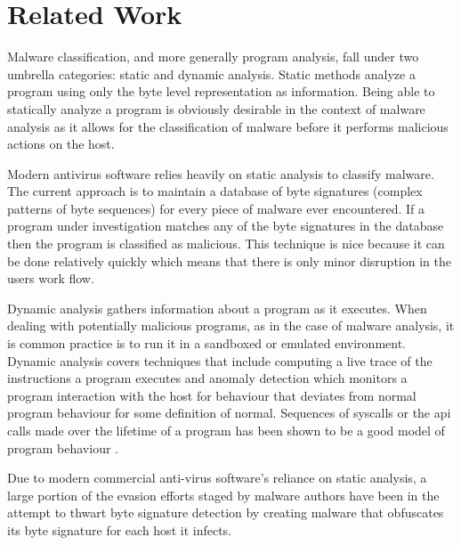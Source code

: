 \chapter{Related Work}

    Malware classification, and more generally program analysis, fall under two
    umbrella categories: static and dynamic analysis. Static methods analyze a
    program using only the byte level representation as information. Being able
    to statically analyze a program is obviously desirable in the context of
    malware analysis as it allows for the classification of malware before it
    performs malicious actions on the host.
    
    Modern antivirus software relies heavily on static analysis to classify
    malware. The current approach is to maintain a database of byte signatures
    (complex patterns of byte sequences) for every piece of malware ever
    encountered. If a program under investigation matches any of the byte
    signatures in the database then the program is classified as malicious.
    This technique is nice because it can be done relatively quickly which means
    that there is only minor disruption in the users work flow.

    Dynamic analysis gathers information about a program as it executes. When
    dealing with potentially malicious programs, as in the case of malware
    analysis, it is common practice is to run it in a sandboxed or emulated
    environment. Dynamic analysis covers techniques that include computing a
    live trace of the instructions a program executes and anomaly detection
    which monitors a program interaction with the host for behaviour that
    deviates from normal program behaviour for some definition of normal.
    Sequences of syscalls or the api calls made over the lifetime of a program
    has been shown to be a good model of program behaviour \cite{api_calls}.

    Due to modern commercial anti-virus software's reliance on static analysis,
    a large portion of the evasion efforts staged by malware authors have been
    in the attempt to thwart byte signature detection by creating malware that
    obfuscates its byte signature for each host it infects.

